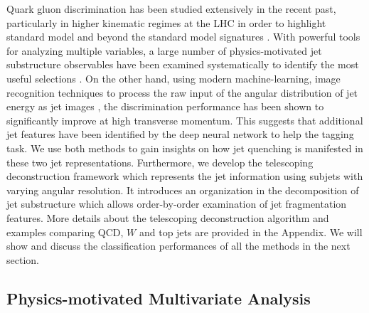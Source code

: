 \documentclass[notoc]{JHEP3}
\begin{document}
Quark gluon discrimination has been studied extensively in the recent past, particularly in higher kinematic regimes at the LHC in order to highlight standard model and beyond the standard model signatures \cite{}. With powerful tools for analyzing multiple variables, a large number of physics-motivated jet substructure observables have been examined systematically to identify the most useful selections \cite{Gallicchio:2011xq,Gallicchio:2012ez}. On the other hand, using modern machine-learning, image recognition techniques to process the raw input of the angular distribution of jet energy as jet images \cite{Komiske:2016rsd}, the discrimination performance has been shown to significantly improve at high transverse momentum. This suggests that additional jet features have been identified by the deep neural network to help the tagging task. We use both methods to gain insights on how jet quenching is manifested in these two jet representations. Furthermore, we develop the telescoping deconstruction framework which represents the jet information using subjets with varying angular resolution. It introduces an organization in the decomposition of jet substructure which allows order-by-order examination of jet fragmentation features. More details about the telescoping deconstruction algorithm and examples comparing QCD, $W$ and top jets are provided in the Appendix. We will show and discuss the classification performances of all the methods in the next section.

\subsection{Physics-motivated Multivariate Analysis}
\label{sec:mva}
\end{document}
